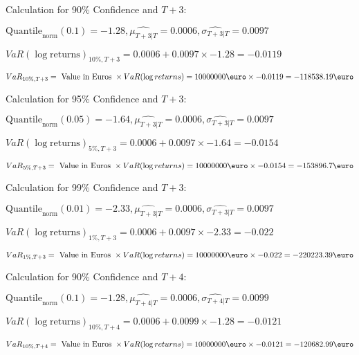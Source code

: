 Calculation for 90\% Confidence and $T+3$:

\indent\indent $\text{Quantile}_\text{norm}(0.1) = -1.28,\hat{\mu_{T+3|T}} = 0.0006, \hat{\sigma_{T+3|T}} = 0.0097$

\indent\indent $VaR(\log \text{returns})_{10\%, T + 3} = 0.0006 + 0.0097\times-1.28 = -0.0119$

\indent\indent $VaR_{10\%, T + 3} = \text{ Value in Euros } \times VaR(\log returns) = 10 000 000 \text{\euro} \times-0.0119 = -118538.19 \text{\euro}$\newline




Calculation for 95\% Confidence and $T+3$:

\indent\indent $\text{Quantile}_\text{norm}(0.05) = -1.64,\hat{\mu_{T+3|T}} = 0.0006, \hat{\sigma_{T+3|T}} = 0.0097$

\indent\indent $VaR(\log \text{returns})_{5\%, T + 3} = 0.0006 + 0.0097\times-1.64 = -0.0154$

\indent\indent $VaR_{5\%, T + 3} = \text{ Value in Euros } \times VaR(\log returns) = 10 000 000 \text{\euro} \times-0.0154 = -153896.7 \text{\euro}$\newline




Calculation for 99\% Confidence and $T+3$:

\indent\indent $\text{Quantile}_\text{norm}(0.01) = -2.33,\hat{\mu_{T+3|T}} = 0.0006, \hat{\sigma_{T+3|T}} = 0.0097$

\indent\indent $VaR(\log \text{returns})_{1\%, T + 3} = 0.0006 + 0.0097\times-2.33 = -0.022$

\indent\indent $VaR_{1\%, T + 3} = \text{ Value in Euros } \times VaR(\log returns) = 10 000 000 \text{\euro} \times-0.022 = -220223.39 \text{\euro}$\newline




Calculation for 90\% Confidence and $T+4$:

\indent\indent $\text{Quantile}_\text{norm}(0.1) = -1.28,\hat{\mu_{T+4|T}} = 0.0006, \hat{\sigma_{T+4|T}} = 0.0099$

\indent\indent $VaR(\log \text{returns})_{10\%, T + 4} = 0.0006 + 0.0099\times-1.28 = -0.0121$

\indent\indent $VaR_{10\%, T + 4} = \text{ Value in Euros } \times VaR(\log returns) = 10 000 000 \text{\euro} \times-0.0121 = -120682.99 \text{\euro}$\newline




